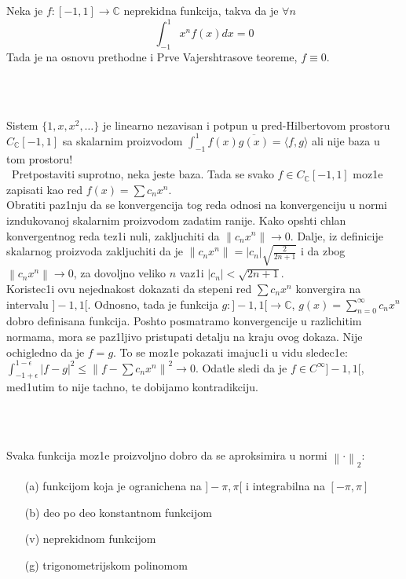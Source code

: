 \documentclass[a4paper,12pt]{article}
\newcommand{\CC}{\mathbb{C}}
\newcommand{\norm}[1]{\left\lVert#1\right\rVert}
\begin{document}
\begin{pr}
Neka je $f:[-1,1] \to \CC$ neprekidna funkcija, takva da je $\forall n$ 
\[\int_{-1}^1 x^n f(x) dx = 0\]
Tada je na osnovu prethodne i Prve Vajershtrasove teoreme, $f\equiv 0$.
\end{pr}
\\ \\
\begin{pr}
Sistem $\{1, x, x^2, \dots \}$ je linearno nezavisan i potpun u pred-Hilbertovom pro\-sto\-ru $C_{\CC}[-1,1]$ sa skalarnim proizvodom $\int_{-1}^1 f(x)\overline{g(x)} = \langle f, g \rangle$ ali nije baza u tom prostoru! \\ \ Pretpostaviti suprotno, neka jeste baza. Tada se svako $f \in C_{\CC}[-1,1]$ moz1e zapisati kao red $f(x) = \sum c_n x^n$. \\ Obratiti paz1nju da se konvergencija tog reda odnosi na konvergenciju u normi iznduko\-va\-noj skalarnim proizvodom zadatim ranije. Kako opshti chlan konvergentnog reda tez1i nuli, zakljuchiti da $\norm{c_n x^n} \to 0$. Dalje, iz definicije skalarnog proizvoda zakljuchiti da je $\norm{c_n x^n} = |c_n| \sqrt{\frac{2}{2n+1}}$ i da zbog $\norm{c_n x^n} \to 0$, za dovoljno veliko $n$ vaz1i $|c_n| < \sqrt{2n+1}$. \\ Koristec1i ovu nejednakost dokazati da stepeni red $\sum c_n x^n$ konvergira na intervalu $]-1, 1[$. Odnosno, tada je funkcija $g: ]-1, 1[ \to \CC$, $g(x) = \sum_{n=0}^{\infty} c_n x^n$ dobro definisana funkcija. Poshto posmatramo konvergencije u razlichitim normama, mora se paz1ljivo pristupati detalju na kraju ovog dokaza. Nije ochigledno da je $f = g$. To se moz1e pokazati imajuc1i u vidu sledec1e: $\int_{-1 + \epsilon}^{1 - \epsilon} {|f-g|}^2 \leq {\norm{f - \sum c_n x^n}}^2 \to 0$. Odatle sledi da je $f \in C^{\infty}]-1, 1[$, med1utim to nije tachno, te dobijamo kontradikciju.
\end{pr}
\\ \\
\begin{tma}
Svaka funkcija moz1e proizvoljno dobro da se aproksimira u normi $\norm{\cdot}_2$:
\begin{itemize}
\item[(a)] funkcijom koja je ogranichena na $]- \pi, \pi[$ i integrabilna na $[-\pi, \pi]$
\item[(b)] deo po deo konstantnom funkcijom
\item[(v)] neprekidnom funkcijom
\item[(g)] trigonometrijskom polinomom
\end{itemize}
\end{tma}
\end{document}
